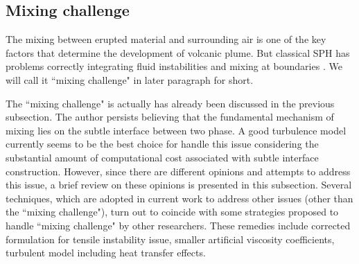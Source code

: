 \subsection{Mixing challenge}

The mixing between erupted material and surrounding air is one of the key factors that determine the development of volcanic plume. 
But classical SPH has problems correctly integrating fluid instabilities and mixing at boundaries \citep{read2010resolving}. We will call it ``mixing challenge" in later paragraph for short.

The ``mixing challenge" is actually has already been discussed in the previous subsection. The author persists believing that the fundamental mechanism of mixing lies on the subtle interface between two phase. A good turbulence model currently seems to be the best choice for handle this issue considering the substantial amount of computational cost associated with subtle interface construction. However, since there are different opinions and attempts to address this issue, a brief review on these opinions is presented in this subsection. Several techniques, which are adopted in current work to address other issues (other than the ``mixing challenge"), turn out to coincide with some strategies proposed to handle ``mixing challenge" by other researchers. These remedies include corrected formulation for tensile instability issue, smaller artificial viscosity coefficients, turbulent model including heat transfer effects.

